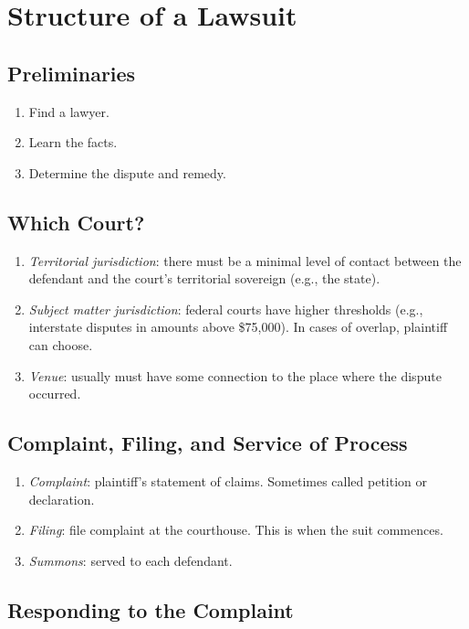 \section{Structure of a Lawsuit}

\subsection{Preliminaries}

\begin{enumerate}
    \item Find a lawyer.
    \item Learn the facts.
    \item Determine the dispute and remedy.
\end{enumerate}

\subsection{Which Court?}

\begin{enumerate}
    \item \emph{Territorial jurisdiction}: there must be a minimal level of contact between the defendant and the court's territorial sovereign (e.g., the state).
    \item \emph{Subject matter jurisdiction}: federal courts have higher thresholds (e.g., interstate disputes in amounts above \$75,000). In cases of overlap, plaintiff can choose.
    \item \emph{Venue}: usually must have some connection to the place where the dispute occurred.
\end{enumerate}

\subsection{Complaint, Filing, and Service of Process}

\begin{enumerate}
    \item \emph{Complaint}: plaintiff's statement of claims. Sometimes called petition or declaration.
    \item \emph{Filing}: file complaint at the courthouse. This is when the suit commences.
    \item \emph{Summons}: served to each defendant.
\end{enumerate}

\subsection{Responding to the Complaint}

